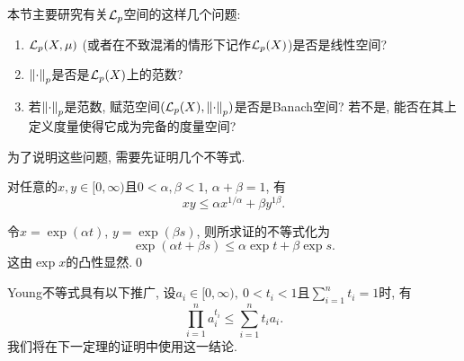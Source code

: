 	本节主要研究有关$ \mathcal{L}_p $空间的这样几个问题:
	\begin{enumerate}[(1)]
	\item $ \mathcal{L}_p(X,\mu) $ (或者在不致混淆的情形下记作$ \mathcal{L}_p(X) $)是否是线性空间?\label{item:1.7节主要问题1}
	\item $ \left\| \cdot \right\|_p $是否是$ \mathcal{L}_p(X) $上的范数?\label{item:1.7节主要问题2}
	\item 若$ \left\| \cdot \right\|_p $是范数, 赋范空间$ (\mathcal{L}_p(X),\left\| \cdot \right\|_p) $是否是Banach空间? 若不是, 能否在其上定义度量使得它成为完备的度量空间?\label{item:1.7节主要问题3}
	\end{enumerate}
	为了说明这些问题, 需要先证明几个不等式.

	\begin{Lemma}[Young]
	对任意的$ x, y\in[0,\infty) $且$ 0<\alpha,\beta<1 $, $ \alpha+\beta=1 $, 有
	\[
	xy\leqslant \alpha x^{1/\alpha}+\beta y^{1\beta}.
	\]
	\end{Lemma}
	\begin{Proof}
	令$ x=\exp(\alpha t) $, $ y=\exp(\beta s) $, 则所求证的不等式化为
	\[
	\exp(\alpha t+\beta s)\leqslant\alpha\exp t+\beta\exp s.
	\]
	这由$ \exp x $的凸性显然.\qed
	\end{Proof}

	\begin{Remark}
	Young不等式具有以下推广, 设$ a_i\in[0,\infty),\ 0<t_i<1 $且$ \sum\limits_{i=1}^nt_i=1 $时, 有
	\[
	\prod_{i=1}^na_i^{t_i}\leqslant\sum_{i=1}^nt_ia_i.
	\]
	我们将在下一定理的证明中使用这一结论.
	\end{Remark}


